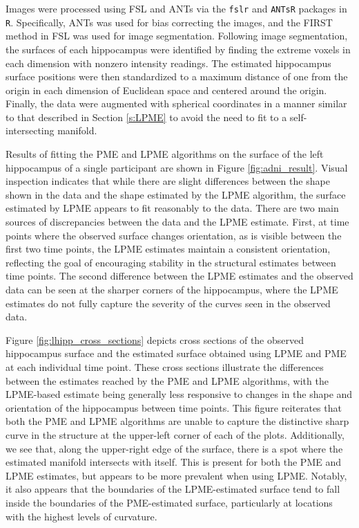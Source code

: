 \documentclass[11pt,reqno]{article}
\newcommand{\zielinski}[1]{{\color{blue} \sf $\spadesuit\spadesuit\spadesuit$ Rob Zielinski: [#1]}}
\theoremstyle{definition}
\begin{document}
Images were processed using FSL and ANTs via the \texttt{fslr} and \texttt{ANTsR} packages in \texttt{R}. Specifically, ANTs was used for bias correcting the images, and the FIRST method in FSL was used for image segmentation. Following image segmentation, the surfaces of each hippocampus were identified by finding the extreme voxels in each dimension with nonzero intensity readings. The estimated hippocampus surface positions were then standardized to a maximum distance of one from the origin in each dimension of Euclidean space and centered around the origin. Finally, the data were augmented with spherical coordinates in a manner similar to that described in Section \ref{s:LPME} to avoid the need to fit to a self-intersecting manifold.


Results of fitting the PME and LPME algorithms on the surface of the left hippocampus of a single participant are shown in Figure \ref{fig:adni_result}. Visual inspection indicates that while there are slight differences between the shape shown in the data and the shape estimated by the LPME algorithm, the surface estimated by LPME appears to fit reasonably to the data. There are two main sources of discrepancies between the data and the LPME estimate. First, at time points where the observed surface changes orientation, as is visible between the first two time points, the LPME estimates maintain a consistent orientation, reflecting the goal of encouraging stability in the structural estimates between time points. The second difference between the LPME estimates and the observed data can be seen at the sharper corners of the hippocampus, where the LPME estimates do not fully capture the severity of the curves seen in the observed data.

Figure \ref{fig:lhipp_cross_sections} depicts cross sections of the observed hippocampus surface and the estimated surface obtained using LPME and PME at each individual time point. These cross sections illustrate the differences between the estimates reached by the PME and LPME algorithms, with the LPME-based estimate being generally less responsive to changes in the shape and orientation of the hippocampus between time points. This figure reiterates that both the PME and LPME algorithms are unable to capture the distinctive sharp curve in the structure at the upper-left corner of each of the plots. Additionally, we see that, along the upper-right edge of the surface, there is a spot where the estimated manifold intersects with itself. This is present for both the PME and LPME estimates, but appears to be more prevalent when using LPME. Notably, it also appears that the boundaries of the LPME-estimated surface tend to fall inside the boundaries of the PME-estimated surface, particularly at locations with the highest levels of curvature.
\end{document}
